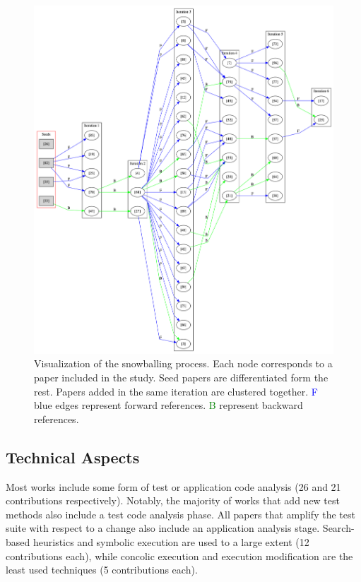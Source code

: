\begin{figure}
	\centering
	\includegraphics[width=1\linewidth]{graph.png}
	\caption{Visualization of the snowballing process. Each node corresponds to a paper included in the study. Seed papers are differentiated form the rest. Papers added in the same iteration are clustered together. \textcolor{blue}{F} blue edges represent forward references. \textcolor{green}{B} represent backward references.}
	\label{fig:citation_graph}
\end{figure}


\subsection{Technical Aspects}
\label{subsec:sota:analysis:technical-aspects}

Most works include some form of test or application code analysis (26 and 21 contributions respectively). 
Notably, the majority of works that add new test methods also include a test code analysis phase. 
All papers that amplify the test suite with respect to a change also include an application analysis stage. 
Search-based heuristics and symbolic execution are used to a large extent (12 contributions each), while concolic execution and execution modification are the least used techniques (5 contributions each).


